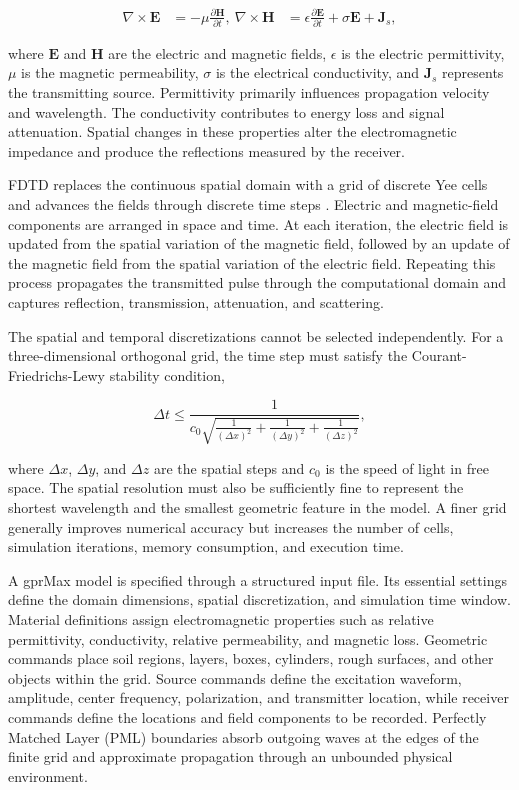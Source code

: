 \documentclass[journal]{IEEEtran}
\begin{document}
\begin{align}
\nabla \times \mathbf{E}
&=
-\mu\frac{\partial \mathbf{H}}{\partial t}, \
\nabla \times \mathbf{H}
&=
\epsilon\frac{\partial \mathbf{E}}{\partial t}
+\sigma\mathbf{E}
+\mathbf{J}_{s},
\end{align}

where $\mathbf{E}$ and $\mathbf{H}$ are the electric and magnetic fields, $\epsilon$ is the electric permittivity, $\mu$ is the magnetic permeability, $\sigma$ is the electrical conductivity, and $\mathbf{J}_{s}$ represents the transmitting source. Permittivity primarily influences propagation velocity and wavelength. The  conductivity contributes to energy loss and signal attenuation. Spatial changes in these properties alter the electromagnetic impedance and produce the reflections measured by the receiver.

FDTD replaces the continuous spatial domain with a grid of discrete Yee cells and advances the fields through discrete time steps \cite{yee1966numerical}. Electric and magnetic-field components are arranged in space and time. At each iteration, the electric field is updated from the spatial variation of the magnetic field, followed by an update of the magnetic field from the spatial variation of the electric field. Repeating this process propagates the transmitted pulse through the computational domain and captures reflection, transmission, attenuation, and scattering.

The spatial and temporal discretizations cannot be selected independently. For a three-dimensional orthogonal grid, the time step must satisfy the Courant-Friedrichs-Lewy stability condition,

\begin{equation}
\Delta t
\leq
\frac{1}
{c_0
\sqrt{
\frac{1}{(\Delta x)^2}
+
\frac{1}{(\Delta y)^2}
+
\frac{1}{(\Delta z)^2}
}},
\end{equation}

where $\Delta x$, $\Delta y$, and $\Delta z$ are the spatial steps and $c_0$ is the speed of light in free space. The spatial resolution must also be sufficiently fine to represent the shortest wavelength and the smallest geometric feature in the model. A finer grid generally improves numerical accuracy but increases the number of cells, simulation iterations, memory consumption, and execution time.

A gprMax model is specified through a structured input file. Its essential settings define the domain dimensions, spatial discretization, and simulation time window. Material definitions assign electromagnetic properties such as relative permittivity, conductivity, relative permeability, and magnetic loss. Geometric commands place soil regions, layers, boxes, cylinders, rough surfaces, and other objects within the grid. Source commands define the excitation waveform, amplitude, center frequency, polarization, and transmitter location, while receiver commands define the locations and field components to be recorded. Perfectly Matched Layer (PML) boundaries absorb outgoing waves at the edges of the finite grid and approximate propagation through an unbounded physical environment.
\end{document}

